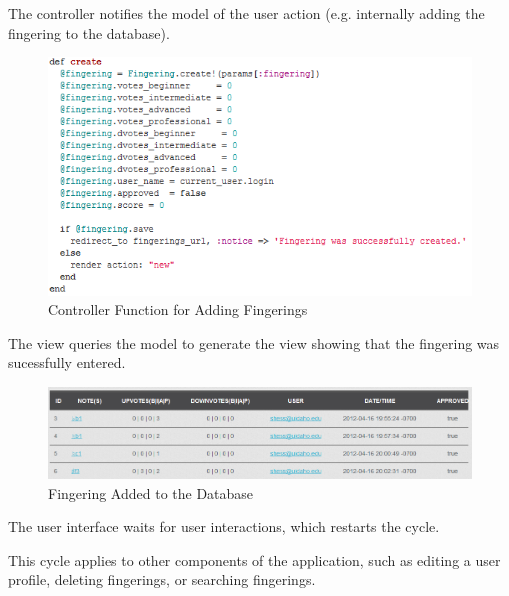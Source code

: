 \documentclass[12pt,english]{article}
\begin{document}
The controller notifies the model of the user action (e.g. internally
adding the fingering to the database).

\begin{figure}[H]
\caption{Controller Function for Adding Fingerings}


\begin{centering}
\includegraphics[scale=0.7]{controller_add}
\par\end{centering}

\end{figure}


The view queries the model to generate the view showing that the fingering
was sucessfully entered.

\begin{figure}[H]
\caption{Fingering Added to the Database}


\noindent \centering{}\includegraphics[scale=0.45]{database_add}
\end{figure}


The user interface waits for user interactions, which restarts the
cycle.

\medskip{}


This cycle applies to other components of the application, such as
editing a user profile, deleting fingerings, or searching fingerings. 
\end{document}
